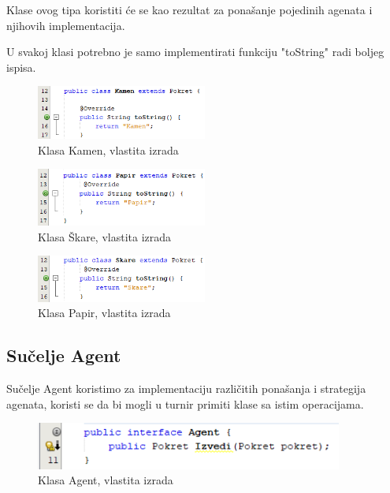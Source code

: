 \documentclass{foi}
\begin{document}
Klase ovog tipa koristiti će se kao rezultat za ponašanje pojedinih agenata i njihovih implementacija.

U svakoj klasi potrebno je samo implementirati funkciju "toString" radi boljeg ispisa.

\begin{figure}[h!]
    \centering
    \includegraphics[width=0.5\textwidth]{slike/Screenshot_11.png}
    \caption{Klasa Kamen, vlastita izrada}
\end{figure}

\begin{figure}[h!]
    \centering
    \includegraphics[width=0.5\textwidth]{slike/Screenshot_12.png}
    \caption{Klasa Škare, vlastita izrada}
\end{figure}

\begin{figure}[h!]
    \centering
    \includegraphics[width=0.5\textwidth]{slike/Screenshot_13.png}
    \caption{Klasa Papir, vlastita izrada}
\end{figure}

\clearpage
\subsection{Sučelje Agent}

Sučelje Agent koristimo za implementaciju različitih ponašanja i strategija agenata, koristi se da bi mogli u turnir primiti klase sa istim operacijama.

\begin{figure}[h!]
    \centering
    \includegraphics[width=0.9\textwidth]{slike/Screenshot_2.png}
    \caption{Klasa Agent, vlastita izrada}
\end{figure}
\end{document}
